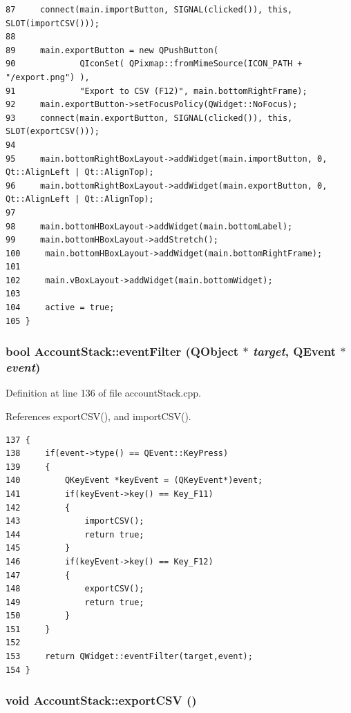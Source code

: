\begin{verbatim}
87     connect(main.importButton, SIGNAL(clicked()), this, SLOT(importCSV()));
88     
89     main.exportButton = new QPushButton(
90             QIconSet( QPixmap::fromMimeSource(ICON_PATH + "/export.png") ),
91             "Export to CSV (F12)", main.bottomRightFrame);
92     main.exportButton->setFocusPolicy(QWidget::NoFocus);
93     connect(main.exportButton, SIGNAL(clicked()), this, SLOT(exportCSV()));
94     
95     main.bottomRightBoxLayout->addWidget(main.importButton, 0, Qt::AlignLeft | Qt::AlignTop);
96     main.bottomRightBoxLayout->addWidget(main.exportButton, 0, Qt::AlignLeft | Qt::AlignTop);
97     
98     main.bottomHBoxLayout->addWidget(main.bottomLabel);
99     main.bottomHBoxLayout->addStretch();
100     main.bottomHBoxLayout->addWidget(main.bottomRightFrame);
101     
102     main.vBoxLayout->addWidget(main.bottomWidget);
103     
104     active = true;
105 }
\end{verbatim}\normalsize 


\hypertarget{classAccountStack_d0}{
\subsubsection[eventFilter]{\setlength{\rightskip}{0pt plus 5cm}bool Account\-Stack::event\-Filter (QObject $\ast$ {\em target}, QEvent $\ast$ {\em event})}}
\label{classAccountStack_d0}


Definition at line 136 of file account\-Stack.cpp.

References export\-CSV(), and import\-CSV().

\footnotesize\begin{verbatim}137 {
138     if(event->type() == QEvent::KeyPress)
139     {
140         QKeyEvent *keyEvent = (QKeyEvent*)event;
141         if(keyEvent->key() == Key_F11)
142         {
143             importCSV();
144             return true;
145         }
146         if(keyEvent->key() == Key_F12)
147         {
148             exportCSV();
149             return true;
150         }
151     }
152     
153     return QWidget::eventFilter(target,event);
154 }  
\end{verbatim}\normalsize 


\hypertarget{classAccountStack_k2}{
\subsubsection[exportCSV]{\setlength{\rightskip}{0pt plus 5cm}void Account\-Stack::export\-CSV ()}}
\label{classAccountStack_k2}


